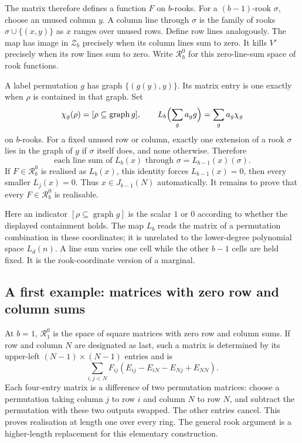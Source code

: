 \documentclass[11pt,a4paper,oneside,openany]{book}
\theoremstyle{definition}\newtheorem{definition}[theorem]{Definition}
\theoremstyle{remark}\newtheorem{remark}[theorem]{Remark}
\numberwithin{equation}{chapter}
\begin{document}
The matrix therefore defines a function $F$ on $b$-rooks. For a $(b-1)$-rook $\sigma$, choose an unused column $y$. A column line through $\sigma$ is the family of rooks $\sigma\cup\{(x,y)\}$ as $x$ ranges over unused rows. Define row lines analogously. The map has image in $\mathcal Z_b$ precisely when its column lines sum to zero. It kills $V'$ precisely when its row lines sum to zero. Write $\mathcal R_b^{0}$ for this zero-line-sum space of rook functions.

A label permutation $g$ has graph $\{(g(y),y)\}$. Its matrix entry is one exactly when $\rho$ is contained in that graph. Set
\[\chi_g(\rho)=[\rho\subseteq\operatorname{graph}g],\qquad
L_b\Bigl(\sum_ga_gg\Bigr)=\sum_ga_g\chi_g
\]
on $b$-rooks. For a fixed unused row or column, exactly one extension of a rook $\sigma$ lies in the graph of $g$ if $\sigma$ itself does, and none otherwise. Therefore
\begin{equation}\label{tx:eq:lines}
\text{each line sum of }L_b(x)\text{ through }\sigma=L_{b-1}(x)(\sigma).
\end{equation}
If $F\in \mathcal R_b^{0}$ is realised as $L_b(x)$, this identity forces $L_{b-1}(x)=0$, then every smaller $L_j(x)=0$. Thus $x\in J_{b-1}(N)$ automatically. It remains to prove that every $F\in \mathcal R_b^{0}$ is realisable.

Here an indicator $[\rho\subseteq\operatorname{graph}g]$ is the
scalar $1$ or $0$ according to whether the displayed containment
holds. The map $L_b$ reads the matrix of a permutation combination
in these coordinates; it is unrelated to the lower-degree polynomial
space $L_d(n)$. A line sum varies one cell while the other $b-1$
cells are held fixed. It is the rook-coordinate version of a marginal.

\subsection{A first example: matrices with zero row and column sums}
At $b=1$, $\mathcal R_1^{0}$ is the space of square matrices with zero row and column sums. If row and column $N$ are designated as last, such a matrix is determined by its upper-left $(N-1)\times(N-1)$ entries and is
\[\sum_{i,j<N}F_{ij}(E_{ij}-E_{iN}-E_{Nj}+E_{NN}).
\]
Each four-entry matrix is a difference of two permutation matrices: choose a permutation taking column $j$ to row $i$ and column $N$ to row $N$, and subtract the permutation with these two outputs swapped. The other entries cancel. This proves realisation at length one over every ring. The general rook argument is a higher-length replacement for this elementary construction.
\end{document}
